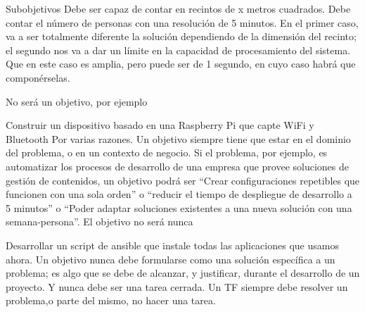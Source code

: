 Subobjetivos
Debe ser capaz de contar en recintos de x metros cuadrados.
Debe contar el número de personas con una resolución de 5 minutos.
En el primer caso, va a ser totalmente diferente la solución 
dependiendo de la dimensión del recinto; el segundo nos va a 
dar un límite en la capacidad de procesamiento del sistema. 
Que en este caso es amplia, pero puede ser de 1 segundo, en 
cuyo caso habrá que componérselas.

No será un objetivo, por ejemplo

Construir un dispositivo basado en una Raspberry Pi que 
capte WiFi y Bluetooth
Por varias razones. Un objetivo siempre tiene que estar 
en el dominio del problema, o en un contexto de negocio. 
Si el problema, por ejemplo, es automatizar los procesos 
de desarrollo de una empresa que provee soluciones de 
gestión de contenidos, un objetivo podrá ser “Crear 
configuraciones repetibles que funcionen con una sola 
orden” o “reducir el tiempo de despliegue de desarrollo 
a 5 minutos” o “Poder adaptar soluciones existentes a 
una nueva solución con una semana-persona”. El objetivo no será nunca

Desarrollar un script de ansible que instale todas las 
aplicaciones que usamos ahora.
Un objetivo nunca debe formularse como una solución 
específica a un problema; es algo que se debe de 
alcanzar, y justificar, durante el desarrollo de 
un proyecto. Y nunca debe ser una tarea cerrada. 
Un TF siempre debe resolver un problema,o parte del mismo, no hacer una tarea.

